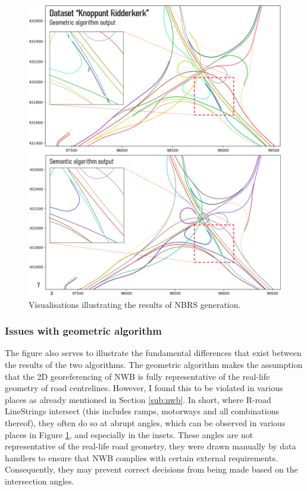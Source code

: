 \begin{figure}
    \centering
    \includegraphics[width=\linewidth]{final_report/figs/nbrsgeneration0.png}
    \caption{Visualisations illustrating the results of NBRS generation.}
    \label{fig:nbrsgeneration0}
\end{figure}

\subsubsection{Issues with geometric algorithm}

The figure also serves to illustrate the fundamental differences that exist between the results of the two algorithms. The geometric algorithm makes the assumption that the 2D georeferencing of NWB is fully representative of the real-life geometry of road centrelines. However, I found this to be violated in various places as already mentioned in Section \ref{sub:nwb}. In short, where R-road LineStrings intersect (this includes ramps, motorways and all combinations thereof), they often do so at abrupt angles, which can be observed in various places in Figure \ref{fig:nbrsgeneration0}, and especially in the insets. These angles are not representative of the real-life road geometry, they were drawn manually by data handlers to ensure that NWB complies with certain external requirements. Consequently, they may prevent correct decisions from being made based on the intersection angles.

